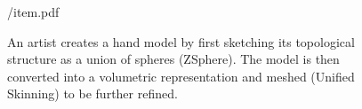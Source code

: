\begin{figure}[t!]
\centering
\begin{overpic} 
[width=\linewidth]
{\currfiledir/item.pdf}
\end{overpic}
\caption{
% 
%
An artist creates a hand model by first sketching its topological structure as a union of spheres (ZSphere{\textcopyright}). The model is then converted into a volumetric representation and meshed (Unified Skinning{\textcopyright}) to be further refined.
% 
% 
}
\label{fig:zsphere}
\end{figure}